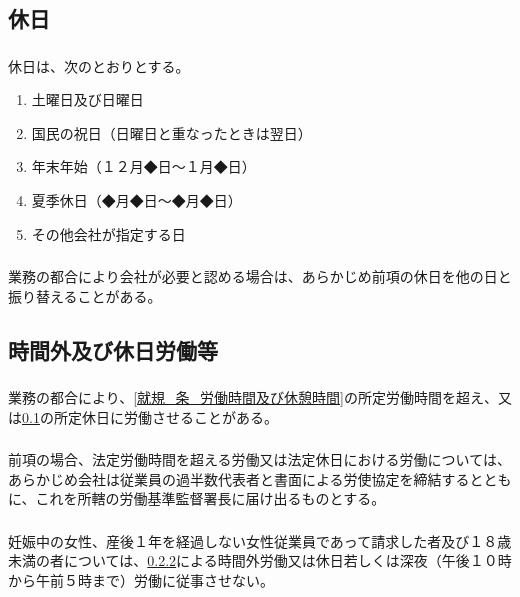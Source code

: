 \documentclass{jsarticle}
\begin{document}
\subsection{休日}
\label{就規_条_休日}
\subsubsection{}
\label{就規_項_休日}
休日は、次のとおりとする。
\begin{enumerate}
  \item 土曜日及び日曜日
  \item 国民の祝日（日曜日と重なったときは翌日）
  \item 年末年始（１２月◆日～１月◆日）
  \item 夏季休日（◆月◆日～◆月◆日）
  \item その他会社が指定する日
\end{enumerate}
\subsubsection{}
\label{就規_項_休日の振替}
業務の都合により会社が必要と認める場合は、あらかじめ前項の休日を他の日と振り替えることがある。

\subsection{時間外及び休日労働等}
\label{就規_条_時間外及び休日労働等}
\subsubsection{}
\label{就規_項_時間外及び休日労働等}
業務の都合により、\ref{就規_条_労働時間及び休憩時間}の所定労働時間を超え、又は\ref{就規_条_休日}の所定休日に労働させることがある。
\subsubsection{}
\label{就規_項_36協定}
前項の場合、法定労働時間を超える労働又は法定休日における労働については、あらかじめ会社は従業員の過半数代表者と書面による労使協定を締結するとともに、これを所轄の労働基準監督署長に届け出るものとする。
\subsubsection{}
\label{就規_項_女性・年少者の時間外・休日労働}
妊娠中の女性、産後１年を経過しない女性従業員であって請求した者及び１８歳未満の者については、\ref{就規_項_36協定}による時間外労働又は休日若しくは深夜（午後１０時から午前５時まで）労働に従事させない。
\end{document}
